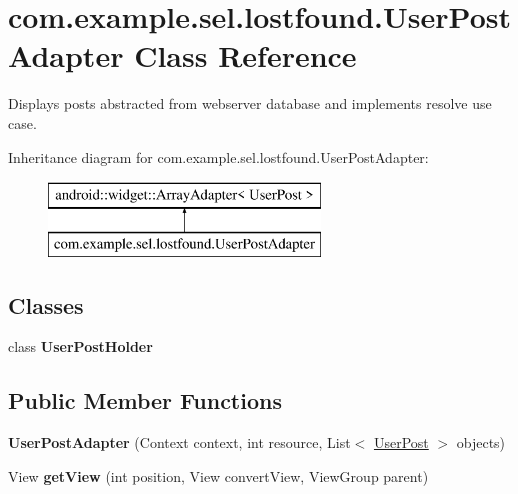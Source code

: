 \hypertarget{classcom_1_1example_1_1sel_1_1lostfound_1_1UserPostAdapter}{}\section{com.\+example.\+sel.\+lostfound.\+User\+Post\+Adapter Class Reference}
\label{classcom_1_1example_1_1sel_1_1lostfound_1_1UserPostAdapter}


Displays posts abstracted from webserver database and implements resolve use case.  


Inheritance diagram for com.\+example.\+sel.\+lostfound.\+User\+Post\+Adapter\+:\begin{figure}[H]
\begin{center}
\leavevmode
\includegraphics[height=2.000000cm]{classcom_1_1example_1_1sel_1_1lostfound_1_1UserPostAdapter}
\end{center}
\end{figure}
\subsection*{Classes}
\begin{DoxyCompactItemize}
\item 
class {\bfseries User\+Post\+Holder}
\end{DoxyCompactItemize}
\subsection*{Public Member Functions}
\begin{DoxyCompactItemize}
\item 
{\bfseries User\+Post\+Adapter} (Context context, int resource, List$<$ \hyperlink{classcom_1_1example_1_1sel_1_1lostfound_1_1UserPost}{User\+Post} $>$ objects)\hypertarget{classcom_1_1example_1_1sel_1_1lostfound_1_1UserPostAdapter_a8770784429d0552a7472193206396700}{}\label{classcom_1_1example_1_1sel_1_1lostfound_1_1UserPostAdapter_a8770784429d0552a7472193206396700}

\item 
View {\bfseries get\+View} (int position, View convert\+View, View\+Group parent)\hypertarget{classcom_1_1example_1_1sel_1_1lostfound_1_1UserPostAdapter_ab3b3a8f8ee3bb0bf9a8a863209009395}{}\label{classcom_1_1example_1_1sel_1_1lostfound_1_1UserPostAdapter_ab3b3a8f8ee3bb0bf9a8a863209009395}

\end{DoxyCompactItemize}


